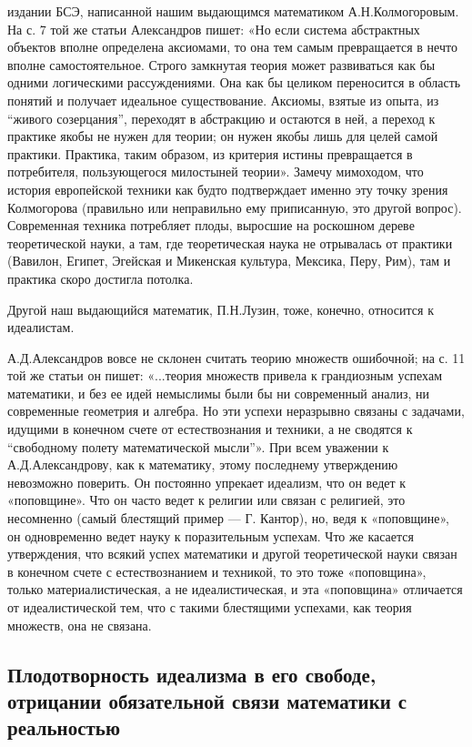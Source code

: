 издании БСЭ, написанной нашим выдающимся математиком А.Н.Колмогоровым.
На с. 7 той же статьи Александров пишет: «Но если система абстрактных
объектов вполне определена аксиомами, то она тем самым превращается в
нечто вполне самостоятельное. Строго замкнутая теория может
развиваться как бы одними логическими рассуждениями. Она как бы
целиком переносится в область понятий и получает идеальное
существование. Аксиомы, взятые из опыта, из ``живого созерцания'',
переходят в абстракцию и остаются в ней, а переход к практике якобы не
нужен для теории; он нужен якобы лишь для целей самой практики.
Практика, таким образом, из критерия истины превращается в
потребителя, пользующегося милостыней теории». Замечу мимоходом, что
история европейской техники как будто подтверждает именно эту точку
зрения Колмогорова (правильно или неправильно ему приписанную, это
другой вопрос). Современная техника потребляет плоды, выросшие на
роскошном дереве теоретической науки, а там, где теоретическая наука
не отрывалась от практики (Вавилон, Египет, Эгейская и Микенская
культура, Мексика, Перу, Рим), там и практика скоро достигла потолка.

Другой наш выдающийся математик, П.Н.Лузин, тоже, конечно, относится
к идеалистам.

А.Д.Александров вовсе не склонен считать теорию множеств ошибочной;
на с. 11 той же статьи он пишет: «...теория множеств привела к
грандиозным успехам математики, и без ее идей немыслимы были бы ни
современный анализ, ни современные геометрия и алгебра. Но эти успехи
неразрывно связаны с задачами, идущими в конечном счете от
естествознания и техники, а не сводятся к ``свободному полету
математической мысли''». При всем уважении к А.Д.Александрову, как к
математику, этому последнему утверждению невозможно поверить. Он
постоянно упрекает идеализм, что он ведет к «поповщине». Что он часто
ведет к религии или связан с религией, это несомненно (самый блестящий
пример --- Г. Кантор), но, ведя к «поповщине», он одновременно ведет
науку к поразительным успехам. Что же касается утверждения, что всякий
успех математики и другой теоретической науки связан в конечном счете
с естествознанием и техникой, то это тоже «поповщина», только
материалистическая, а не идеалистическая, и эта «поповщина» отличается
от идеалистической тем, что с такими блестящими успехами, как теория
множеств, она не связана.

\subsection{Плодотворность идеализма в его свободе, отрицании
обязательной связи математики с реальностью}

